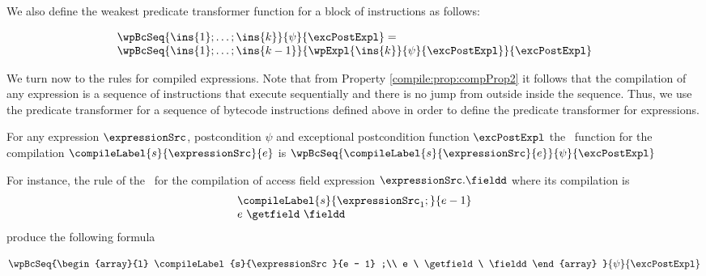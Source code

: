 We also define the weakest predicate transformer function  for a block of instructions as follows:

\begin{wpSeq}\label{pog:wpBc:wpSeq}
     $$ \begin{array}{l} 
              \wpBcSeq{ \ins{1};\ldots;\ins{k}}{ \psi  } { \excPostExpl } =\\
              \wpBcSeq{\ins{1};\ldots;\ins{k -1} }{ \wpExpl{ \ins{k} }{ \psi }{ \excPostExpl} }{\excPostExpl} 
        \end{array}$$ 

\end{wpSeq}



We turn now to the rules for compiled expressions. Note that from Property \ref{compile:prop:compProp2} it follows that 
the compilation of any expression is a sequence of instructions that execute sequentially and there is no jump from outside inside 
the sequence. Thus, we use 
the predicate transformer  for a sequence of bytecode instructions defined above in order to define 
the predicate transformer for  expressions. 

\begin{wpExpr} \label{wpExpr}
               For any expression $\expressionSrc$, postcondition $\psi$ and exceptional postcondition function
               $\excPostExpl$ the \wpName \ function for the compilation $\compileLabel{s}{\expressionSrc}{e}$  is
               $ \wpBcSeq{\compileLabel{s}{\expressionSrc}{e} }{ \psi  } { \excPostExpl }  $
 \end{wpExpr}

For instance, the  rule of the \wpName  \ for the compilation of access  field expression $\expressionSrc.\fieldd $ 
where its compilation is 
$$\begin{array}{l}
    \compileLabel{s}{ \expressionSrc_1;}{e - 1}\\
     e \ \getfield \ \fieldd \\
 \end{array}
$$
  produce the following formula 
 
$$  \wpBcSeq{\begin{array}{l}
	              \compileLabel{s}{\expressionSrc }{e - 1} ;\\
	              e \ \getfield \ \fieldd 
	           \end{array} }{ \psi  } { \excPostExpl } $$	

